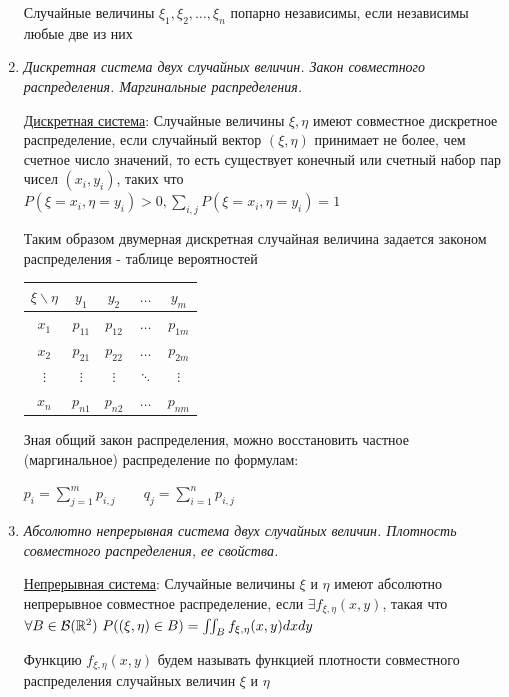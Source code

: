 \documentclass[12pt]{article}
\begin{document}
\begin{enumerate}
    Случайные величины $\xi_1, \xi_2, \dots, \xi_n$ попарно независимы, если независимы любые две из них

    \item \textit{Дискретная система двух случайных величин. Закон совместного распределения. Маргинальные распределения.}

    \hyperlink{discretesystemoftwovariables}{Дискретная система}: Случайные величины $\xi, \eta$ имеют совместное дискретное распределение, если случайный вектор $(\xi, \eta)$
    принимает не более, чем счетное число значений, то есть существует конечный или счетный набор пар чисел $(x_i, y_i)$, 
    таких что $P(\xi = x_i, \eta = y_i) > 0, \sum_{i, j} P(\xi = x_i, \eta = y_i) = 1$
    
    Таким образом двумерная дискретная случайная величина задается законом распределения - таблице вероятностей

    \begin{tabular}{c|c|c|c|c}
        $\xi \backslash \eta$ & $y_1$ & $y_2$ & $\dots$ & $y_m$ \\
        \hline
        $x_1$ & $p_{11}$ & $p_{12}$ & $\dots$ & $p_{1m}$ \\
        \hline
        $x_2$ & $p_{21}$ & $p_{22}$ & $\dots$ & $p_{2m}$ \\
        \hline
        $\vdots$ & $\vdots$ & $\vdots$ & $\ddots$ & $\vdots$ \\
        \hline
        $x_n$ & $p_{n1}$ & $p_{n2}$ & $\dots$ & $p_{nm}$ \\
    \end{tabular}

    Зная общий закон распределения, можно восстановить частное (маргинальное) распределение по формулам: 

    $p_i = \sum_{j = 1}^m p_{i, j} \qquad q_j = \sum_{i = 1}^n p_{i, j}$

    \item \textit{Абсолютно непрерывная система двух случайных величин. Плотность совместного распределения, ее свойства.}
    
    \hyperlink{continuoussystemoftwovariables}{Непрерывная система}: Случайные величины $\xi$ и $\eta$ имеют абсолютно непрерывное совместное распределение, если
    $\exists f_{\xi, \eta}(x, y)$, такая что $\forall B \in \mathcal{B}(\mathbb{R}^2) \ P((\xi, \eta) \in B) = \iint_B f_{\xi, \eta}(x, y) dxdy$

    Функцию $f_{\xi, \eta}(x, y)$ будем называть функцией плотности совместного распределения случайных величин $\xi$ и $\eta$


\end{enumerate}
\end{document}
